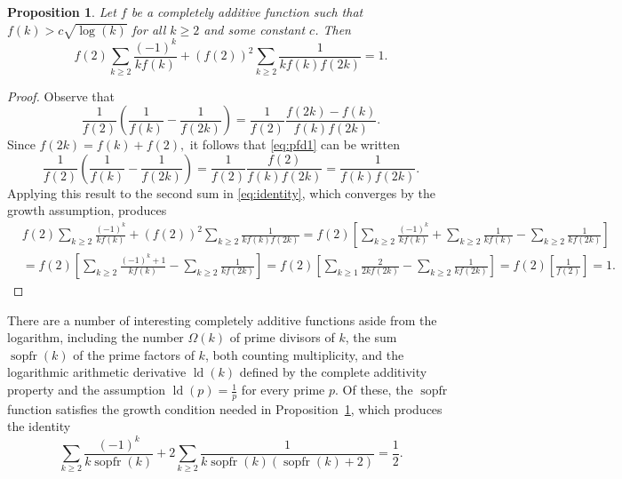 \documentclass[11pt,oneside,reqno]{article}
\DeclareMathOperator{\ld}{ld}
\DeclareMathOperator{\sopfr}{sopfr}
\newtheorem*{proposition}{Proposition}
\theoremstyle{definition}
\begin{document}
\begin{proposition}\label{prop:completely-add}
    Let $f$ be a completely additive function such that $f(k)> c\sqrt{\log(k)}$ for all $k\ge2$ and some constant $c$. Then
    \begin{equation}\label{eq:identity}
        f(2)\sum_{k\ge2}\frac{(-1)^k}{kf(k)}+(f(2))^2\sum_{k\ge2}\frac{1}{kf(k)f(2k)}=1.
    \end{equation}
\end{proposition}
\begin{proof}
    Observe that
    \begin{equation}\label{eq:pfd1}
        \frac{1}{f(2)}\left(\frac{1}{f(k)}-\frac{1}{f(2k)}\right)=\frac{1}{f(2)}\frac{f(2k)-f(k)}{f(k)f(2k)}.
    \end{equation}
    Since $f(2k) = f(k)+f(2),$ it follows that \eqref{eq:pfd1} can be written
    \begin{equation}
        \frac{1}{f(2)}\left(\frac{1}{f(k)}-\frac{1}{f(2k)}\right)=\frac{1}{f(2)}\frac{f(2)}{f(k)f(2k)}=\frac{1}{f(k)f(2k)}.
    \end{equation}
    Applying this result to the second sum in \eqref{eq:identity}, which converges by the growth assumption, produces
    \begin{align}
    \nonumber
        &f(2)\sum_{k\ge2}\frac{(-1)^k}{kf(k)}+(f(2))^2\sum_{k\ge2}\frac{1}{kf(k)f(2k)}=f(2)\left[\sum_{k\ge2}\frac{(-1)^k}{kf(k)}+\sum_{k\ge2}\frac{1}{kf(k)}-\sum_{k\ge2}\frac{1}{kf(2k)}\right]\\
        \nonumber
        &=f(2)\left[\sum_{k\ge2}\frac{(-1)^k+1}{kf(k)}-\sum_{k\ge2}\frac{1}{kf(2k)}\right]=f(2)\left[\sum_{k\ge1}\frac{2}{2kf(2k)}-\sum_{k\ge2}\frac{1}{kf(2k)}\right]=f(2)\left[\frac{1}{f(2)}\right]=1.
    \end{align}
\end{proof}

There are a number of interesting completely additive functions aside from the logarithm, including the number $\Omega(k)$ of prime divisors of $k$, the sum $\sopfr(k)$ of the prime factors of $k$, both counting multiplicity, and the logarithmic arithmetic derivative $\ld(k)$ \cite{Zachary} defined by the complete additivity property and the assumption $\ld(p)=\frac{1}{p}$ for every prime $p$. Of these, the $\sopfr$ function satisfies the growth condition needed in Proposition~\ref{prop:completely-add}, which produces the identity
\begin{equation}
        \sum_{k\ge2}\frac{(-1)^k}{k\sopfr(k)}+2\sum_{k\ge2}\frac{1}{k\sopfr(k)(\sopfr(k)+2)}=\frac12.
\end{equation}
\end{document}
